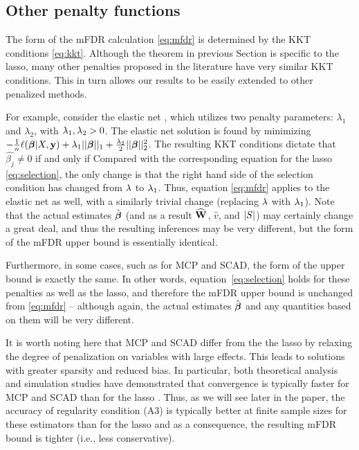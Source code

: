 \subsection{Other penalty functions}

The form of the mFDR calculation \eqref{eq:mfdr} is determined by the KKT conditions \eqref{eq:kkt}.  Although the theorem in previous Section is specific to the lasso, many other penalties proposed in the literature have very similar KKT conditions. This in turn allows our results to be easily extended to other penalized methods.

For example, consider the elastic net \citep{Elastic_Net}, which utilizes two penalty parameters: $\lambda_1$ and $\lambda_2$, with $\lambda_1, \lambda_2 >0$. The elastic net solution is found by minimizing $-\frac{1}{n} \ell(\boldsymbol{\beta}|X,\mathbf{y}) + \lambda_1 ||\boldsymbol{\beta}||_1 + \frac{\lambda_2}{2}||\boldsymbol{\beta}||_{2}^2 $. The resulting KKT conditions dictate that $\hat{\beta_j} \neq 0$ if and only if
Compared with the corresponding equation for the lasso \eqref{eq:selection}, the only change is that the right hand side of the selection condition has changed from $\lambda$ to $\lambda_1$.  Thus, equation \eqref{eq:mfdr} applies to the elastic net as well, with a similarly trivial change (replacing $\lambda$ with $\lambda_1$).  Note that the actual estimates $\hat{\boldsymbol{\beta}}$ (and as a result $\widehat{\mathbf{W}}$, $\hat{v}$, and $\left\lvert S\right\rvert$) may certainly change a great deal, and thus the resulting inferences may be very different, but the form of the mFDR upper bound is essentially identical.

Furthermore, in some cases, such as for MCP and SCAD, the form of the upper bound is exactly the same.  In other words, equation~\eqref{eq:selection} holds for these penalties as well as the lasso, and therefore the mFDR upper bound is unchanged from \eqref{eq:mfdr} -- although again, the actual estimates $\hat{\boldsymbol{\beta}}$ and any quantities based on them will be very different.

It is worth noting here that MCP and SCAD differ from the the lasso by relaxing the degree of penalization on variables with large effects.  This leads to solutions with greater sparsity and reduced bias.  In particular, both theoretical analysis and simulation studies have demonstrated that convergence is typically faster for MCP and SCAD than for the lasso \citep{MCP,SCAD,Breheny2011}.  Thus, as we will see later in the paper, the accuracy of regularity condition (A3) is typically better at finite sample sizes for these estimators than for the lasso and as a consequence, the resulting mFDR bound is tighter (i.e., less conservative).

